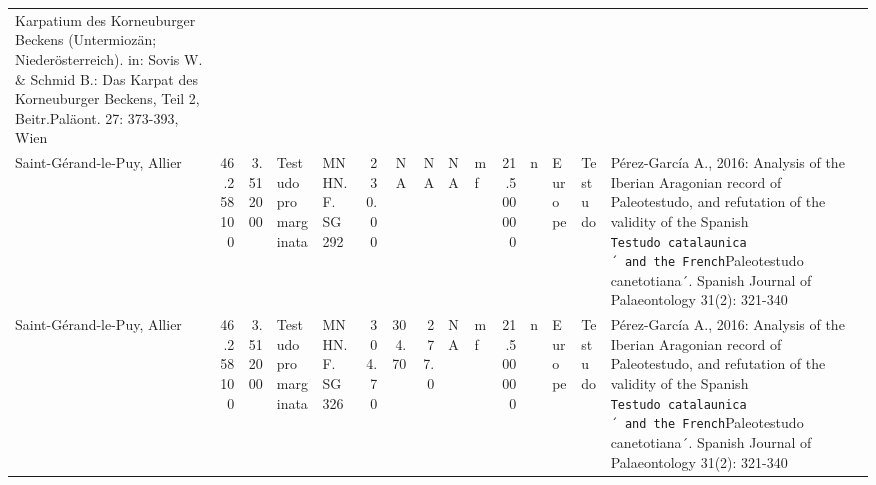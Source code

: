 \documentclass[]{article}
\begin{document}
\begin{longtable}[]{@{}lrrllrrrllrllll@{}}
Karpatium des Korneuburger Beckens (Untermiozän; Niederösterreich). in:
Sovis W. \& Schmid B.: Das Karpat des Korneuburger Beckens, Teil 2,
Beitr.Paläont. 27: 373-393, Wien\tabularnewline
Saint-Gérand-le-Puy, Allier & 46.258100 & 3.512000 & Testudo
promarginata & MNHN.F. SG 292 & 230.00 & NA & NA & NA & mf & 21.500000 &
n & Europe & Testudo & Pérez-García A., 2016: Analysis of the Iberian
Aragonian record of Paleotestudo, and refutation of the validity of the
Spanish \texttt{Testudo\ catalaunica´\ and\ the\ French}Paleotestudo
canetotiana´. Spanish Journal of Palaeontology 31(2):
321-340\tabularnewline
Saint-Gérand-le-Puy, Allier & 46.258100 & 3.512000 & Testudo
promarginata & MNHN.F. SG 326 & 304.70 & 304.70 & 277.0 & NA & mf &
21.500000 & n & Europe & Testudo & Pérez-García A., 2016: Analysis of
the Iberian Aragonian record of Paleotestudo, and refutation of the
validity of the Spanish
\texttt{Testudo\ catalaunica´\ and\ the\ French}Paleotestudo
canetotiana´. Spanish Journal of Palaeontology 31(2):
321-340\tabularnewline
\bottomrule
\end{longtable}
\end{document}
